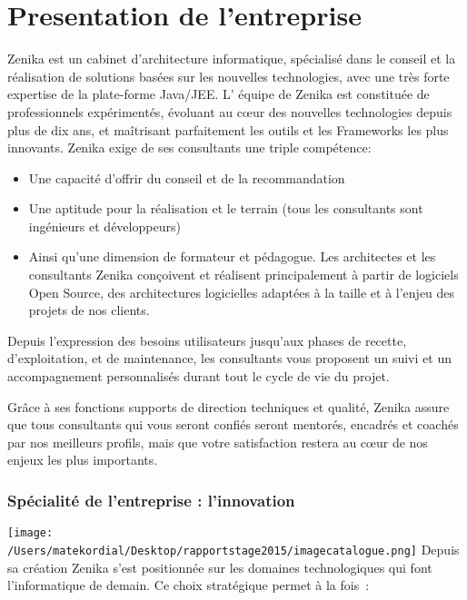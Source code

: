 \def\format{complete}

\chapter{Presentation de l'entreprise}
\label{presentationdelentreprise}

Zenika est un cabinet d'architecture informatique, spécialisé dans le conseil et la réalisation de solutions basées sur les nouvelles technologies, avec une très forte expertise de la plate-forme Java\slash JEE.
L' équipe de Zenika est constituée de professionnels expérimentés, évoluant
au cœur des nouvelles technologies depuis plus de dix ans, et
maîtrisant parfaitement les outils et les Frameworks les plus innovants.
Zenika exige de ses consultants une triple compétence:

\begin{itemize}
\item Une capacité d’offrir du conseil et de la recommandation

\item Une aptitude pour la réalisation et le terrain (tous les consultants sont ingénieurs et développeurs)

\item Ainsi qu’une dimension de formateur et pédagogue.
Les architectes et les consultants Zenika conçoivent et réalisent principalement à partir de logiciels Open Source, des architectures logicielles adaptées à la taille et à l’enjeu des projets de nos clients.

\end{itemize}

Depuis l'expression des besoins utilisateurs jusqu’aux phases de recette, d’exploitation, et de maintenance, les consultants vous proposent un suivi et un accompagnement personnalisés durant tout le cycle de vie du projet.

Grâce à ses fonctions supports de direction techniques et qualité, Zenika assure que tous consultants qui vous seront confiés seront mentorés, encadrés et coachés par nos meilleurs profils, mais que votre satisfaction restera au cœur de nos enjeux les plus importants.

\subsection{Spécialité de l'entreprise : l'innovation}
\label{spcialitdelentreprise:linnovation}

\texttt{[image: /Users/matekordial/Desktop/rapportstage2015/imagecatalogue.png]}
Depuis sa création Zenika s’est positionnée sur les domaines technologiques qui font l’informatique de demain. Ce choix stratégique permet à la fois :


